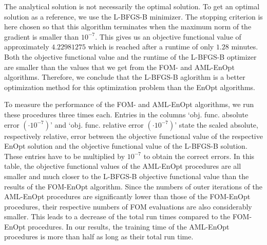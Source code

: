 The analytical solution is not necessarily the optimal solution. To get an optimal solution as a reference, we use the L-BFGS-B minimizer. The stopping criterion is here chosen so that this algorithm terminates when the maximum norm of the gradient is smaller than $10^{-7}$. This gives us an objective functional value of approximately $4.22981275$ which is reached after a runtime of only $1.28$ minutes. Both the objective functional value and the runtime of the L-BFGS-B optimizer are smaller than the values that we get from the FOM- and AML-EnOpt algorithms. Therefore, we conclude that the L-BFGS-B aglorithm is a better optimization method for this optimization problem than the EnOpt algorithms.

To measure the performance of the FOM- and AML-EnOpt algorithms, we run these procedures three times each. Entries in the columns `obj. func. absolute error $(\cdot 10^{-7})$' and `obj. func. relative error $(\cdot 10^{-7})$' state the scaled absolute, respectively relative, error between the objective functional value of the respective EnOpt solution and the objective functional value of the L-BFGS-B solution. These entries have to be multiplied by $10^{-7}$ to obtain the correct errors. In this table, the objective functional values of the AML-EnOpt procedures are all smaller and much closer to the L-BFGS-B objective functional value than the results of the FOM-EnOpt algorithm. Since the numbers of outer iterations of the AML-EnOpt procedures are significantly lower than those of the FOM-EnOpt procedures, their respective numbers of FOM evaluations are also considerably smaller. This leads to a decrease of the total run times compared to the FOM-EnOpt procedures. In our results, the training time of the AML-EnOpt procedures is more than half as long as their total run time.\\

